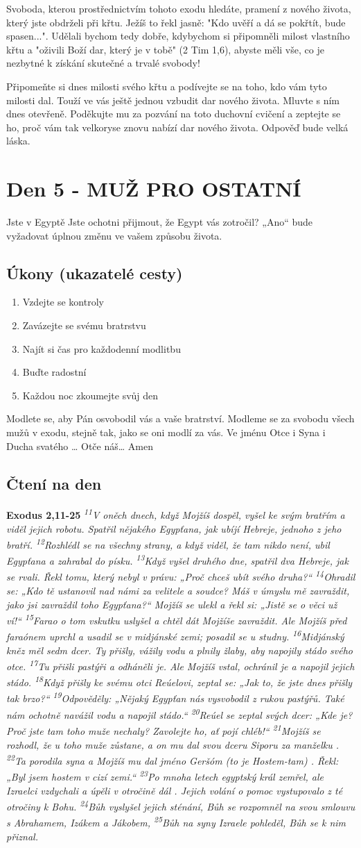 \documentclass[11pt]{article}
\newcommand{\zacatekPrvniTyden}{
  Jste v Egyptě \newline
  Jste ochotni přijmout, že Egypt vás zotročil? „Ano“ bude vyžadovat úplnou změnu ve vašem způsobu života.

\subsection*{Úkony (ukazatelé cesty)}
\begin{enumerate}
  \item Vzdejte se kontroly
  \item Zavázejte se svému bratrstvu
  \item Najít si čas pro každodenní modlitbu
  \item Buďte radostní
  \item Každou noc zkoumejte svůj den
\end{enumerate}
Modlete se, aby Pán osvobodil vás a vaše bratrství. \newline
Modleme se za svobodu všech mužů v exodu, stejně tak, jako se oni modlí za vás.\newline
Ve jménu Otce i Syna i Ducha svatého …  Otče náš… Amen
}
\begin{document}
Svoboda, kterou prostřednictvím tohoto exodu hledáte, pramení z nového života, který jste obdrželi při křtu.
Ježíš to řekl jasně: "Kdo uvěří a dá se pokřtít, bude spasen...". Udělali bychom tedy dobře, kdybychom si připomněli milost vlastního křtu a "oživili Boží dar, který je v tobě" (2 Tim 1,6), abyste měli vše, co je nezbytné k získání skutečné a trvalé svobody!

Připomeňte si dnes milosti svého křtu a podívejte se na toho, kdo vám tyto milosti dal. Touží ve vás ještě jednou vzbudit dar nového života. Mluvte s ním dnes otevřeně. Poděkujte mu za pozvání na toto duchovní cvičení a zeptejte se ho, proč vám tak velkoryse znovu nabízí dar nového života. Odpověď bude velká láska.

\newpage
\section{Den 5 - MUŽ PRO OSTATNÍ}
\zacatekPrvniTyden
\subsection*{Čtení na den}
\textbf{Exodus 2,11-25}
\newline
\textit{
\textsuperscript{11}V oněch dnech, když Mojžíš dospěl, vyšel ke svým bratřím a viděl jejich robotu. Spatřil nějakého Egypťana, jak ubíjí Hebreje, jednoho z jeho bratří.
\textsuperscript{12}Rozhlédl se na všechny strany, a když viděl, že tam nikdo není, ubil Egypťana a zahrabal do písku.
\textsuperscript{13}Když vyšel druhého dne, spatřil dva Hebreje, jak se rvali. Řekl tomu, který nebyl v právu: „Proč chceš ubít svého druha?“
\textsuperscript{14}Ohradil se: „Kdo tě ustanovil nad námi za velitele a soudce? Máš v úmyslu mě zavraždit, jako jsi zavraždil toho Egypťana?“ Mojžíš se ulekl a řekl si: „Jistě se o věci už ví!“
\textsuperscript{15}Farao o tom vskutku uslyšel a chtěl dát Mojžíše zavraždit. Ale Mojžíš před faraónem uprchl a usadil se v midjánské zemi; posadil se u studny.
\textsuperscript{16}Midjánský kněz měl sedm dcer. Ty přišly, vážily vodu a plnily žlaby, aby napojily stádo svého otce.
\textsuperscript{17}Tu přišli pastýři a odháněli je. Ale Mojžíš vstal, ochránil je a napojil jejich stádo.
\textsuperscript{18}Když přišly ke svému otci Reúelovi, zeptal se: „Jak to, že jste dnes přišly tak brzo?“
\textsuperscript{19}Odpověděly: „Nějaký Egypťan nás vysvobodil z rukou pastýřů. Také nám ochotně navážil vodu a napojil stádo.“
\textsuperscript{20}Reúel se zeptal svých dcer: „Kde je? Proč jste tam toho muže nechaly? Zavolejte ho, ať pojí chléb!“
\textsuperscript{21}Mojžíš se rozhodl, že u toho muže zůstane, a on mu dal svou dceru Siporu za manželku .
\textsuperscript{22}Ta porodila syna a Mojžíš mu dal jméno Geršóm (to je Hostem-tam) . Řekl: „Byl jsem hostem v cizí zemi.“
\textsuperscript{23}Po mnoha letech egyptský král zemřel, ale Izraelci vzdychali a úpěli v otročině dál . Jejich volání o pomoc vystupovalo z té otročiny k Bohu.
\textsuperscript{24}Bůh vyslyšel jejich sténání, Bůh se rozpomněl na svou smlouvu s Abrahamem, Izákem a Jákobem,
\textsuperscript{25}Bůh na syny Izraele pohleděl, Bůh se k nim přiznal.
}
\end{document}
